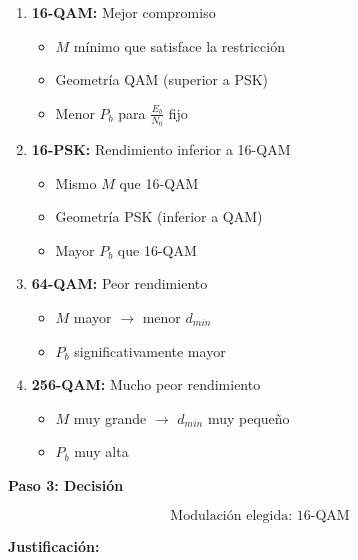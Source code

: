 \documentclass[11pt,a4paper]{article}
\begin{document}
\begin{enumerate}
    \item \textbf{16-QAM:} Mejor compromiso
    \begin{itemize}
        \item $M$ m\'inimo que satisface la restricci\'on
        \item Geometr\'ia QAM (superior a PSK)
        \item Menor $P_b$ para $\frac{E_b}{N_0}$ fijo
    \end{itemize}
    
    \item \textbf{16-PSK:} Rendimiento inferior a 16-QAM
    \begin{itemize}
        \item Mismo $M$ que 16-QAM
        \item Geometr\'ia PSK (inferior a QAM)
        \item Mayor $P_b$ que 16-QAM
    \end{itemize}
    
    \item \textbf{64-QAM:} Peor rendimiento
    \begin{itemize}
        \item $M$ mayor $\to$ menor $d_{min}$
        \item $P_b$ significativamente mayor
    \end{itemize}
    
    \item \textbf{256-QAM:} Mucho peor rendimiento
    \begin{itemize}
        \item $M$ muy grande $\to$ $d_{min}$ muy peque\~no
        \item $P_b$ muy alta
    \end{itemize}
\end{enumerate}

\textbf{Paso 3: Decisi\'on}

\[
\boxed{\text{Modulaci\'on elegida: 16-QAM}}
\]

\textbf{Justificaci\'on:}
\end{document}
